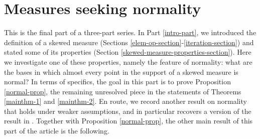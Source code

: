 \documentclass[12pt, twoside]{article}
\def\red{\color{red}}
\theoremstyle{definition}
\numberwithin{equation}{section}
\begin{document}
\part{Measures seeking normality} \label{part-normality} 
This is the final part of a three-part series. In Part \ref{intro-part}, we introduced the definition of a skewed measure (Sections \ref{elem-op-section}-\ref{iteration-section}) and stated some of its properties (Section \ref{skewed-measure-properties-section}).  Here we investigate one of these properties, namely the feature of normality: what are the bases in which almost every point in the support of a skewed measure is normal? 
\vskip0.1in 
\noindent In terms of specifics, the goal in this part is to prove Proposition \ref{normal-prop}, the remaining unresolved piece in the statements of Theorems \ref{mainthm-1} and \ref{mainthm-2}. En route, we record another result on normality that holds under weaker assumptions, and in particular recovers a version of the result in \cite{PZ-1}. 
Together with Proposition \ref{normal-prop}, the other main result of this part of the article is the following.
\end{document}
